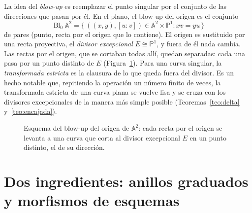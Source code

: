 \documentclass[11pt,a4paper,oneside]{book}
\newcommand{\Bl}{\operatorname{Bl}}
\newcommand{\A}{\mathbb{A}}
\newcommand{\PP}{\mathbb{P}}
\theoremstyle{plain}
\theoremstyle{definition}
\theoremstyle{remark}
\begin{document}
La idea del \emph{blow-up} es reemplazar el punto singular por el conjunto de las direcciones que pasan por él. En el plano, el blow-up del origen es el conjunto
\[
\Bl_0\A^2=\{\,((x,y),[u:v])\in\A^2\times\PP^1 : xv=yu\,\}
\]
de pares (punto, recta por el origen que lo contiene). El origen es sustituido por una recta proyectiva, el \emph{divisor excepcional} $E\cong\PP^1$, y fuera de él nada cambia. Las rectas por el origen, que se cortaban todas allí, quedan separadas: cada una pasa por un punto distinto de $E$ (Figura~\ref{fig:blowup-plano}). Para una curva singular, la \emph{transformada estricta} es la clausura de lo que queda fuera del divisor. Es un hecho notable que, repitiendo la operación un número finito de veces, la transformada estricta de una curva plana se vuelve lisa y se cruza con los divisores excepcionales de la manera más simple posible (Teoremas~\ref{teo:delta} y~\ref{teo:encajada}).

\begin{figure}[ht]
\centering
{}
\caption{Esquema del blow-up del origen de $\A^2$: cada recta por el origen se levanta a una curva que corta al divisor excepcional $E$ en un punto distinto, el de su dirección.}
\label{fig:blowup-plano}
\end{figure}

\section{Dos ingredientes: anillos graduados y morfismos de esquemas}
\end{document}
